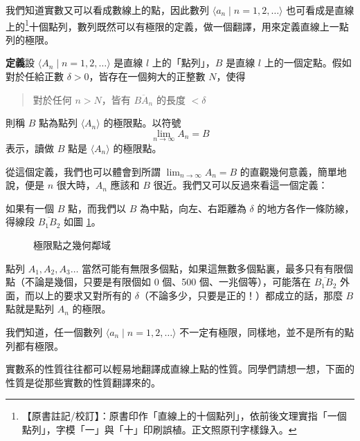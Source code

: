 我們知道實數又可以看成數線上的點，因此數列 $\langle a_n \mid n=1,2,\dots \rangle$ 也可看成是直線上的\label{note:b3-a1-p276-ten}\footnote{【原書註記/校訂】：原書印作「直線上的十個點列」，依前後文理實指「一個點列」，字模「一」與「十」印刷誤植。正文照原刊字樣錄入。}十個點列，數列既然可以有極限的定義，做一個翻譯，用來定義直線上一點列的極限。

\noindent\textbf{定義}\quad 設 $\langle A_n \mid n=1,2,\dots \rangle$ 是直線 $l$ 上的「點列」，$B$ 是直線 $l$ 上的一個定點。假如對於任給正數 $\delta > 0$，皆存在一個夠大的正整數 $N$，使得
\begin{quote}
  對於任何 $n > N$，皆有 $\overline{BA_n}$ 的長度 $< \delta$
\end{quote}
則稱 $B$ 點為點列 $\langle A_n \rangle$ 的極限點。以符號
\[ \lim_{n \to \infty} A_n = B \]
表示，讀做 $B$ 點是 $\langle A_n \rangle$ 的極限點。

從這個定義，我們也可以體會到所謂 $\lim_{n \to \infty} A_n = B$ 的直觀幾何意義，簡單地說，便是 $n$ 很大時，$A_n$ 應該和 $B$ 很近。我們又可以反過來看這一個定義：

如果有一個 $B$ 點，而我們以 $B$ 為中點，向左、右距離為 $\delta$ 的地方各作一條防線，得線段 $\overline{B_1B_2}$ 如圖 \ref{fig:b3-a1-23}。

\begin{figure}[H]
\centering
{}
\caption{極限點之幾何鄰域}
\label{fig:b3-a1-23}
\end{figure}

點列 $A_1, A_2, A_3 \dots$ 當然可能有無限多個點，如果這無數多個點裏，最多只有有限個點（不論是幾個，只要是有限個如 0 個、500 個、一兆個等），可能落在 $\overline{B_1B_2}$ 外面，而以上的要求又對所有的 $\delta$（不論多少，只要是正的！）都成立的話，那麼 $B$ 點就是點列 $A_n$ 的極限。

我們知道，任一個數列 $\langle a_n \mid n=1,2,\dots \rangle$ 不一定有極限，同樣地，並不是所有的點列都有極限。

實數系的性質往往都可以輕易地翻譯成直線上點的性質。同學們請想一想，下面的性質是從那些實數的性質翻譯來的。

